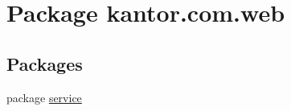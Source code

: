 \hypertarget{namespacekantor_1_1com_1_1web}{\section{Package kantor.\+com.\+web}
\label{namespacekantor_1_1com_1_1web}
}
\subsection*{Packages}
\begin{DoxyCompactItemize}
\item 
package \hyperlink{namespacekantor_1_1com_1_1web_1_1service}{service}
\end{DoxyCompactItemize}
